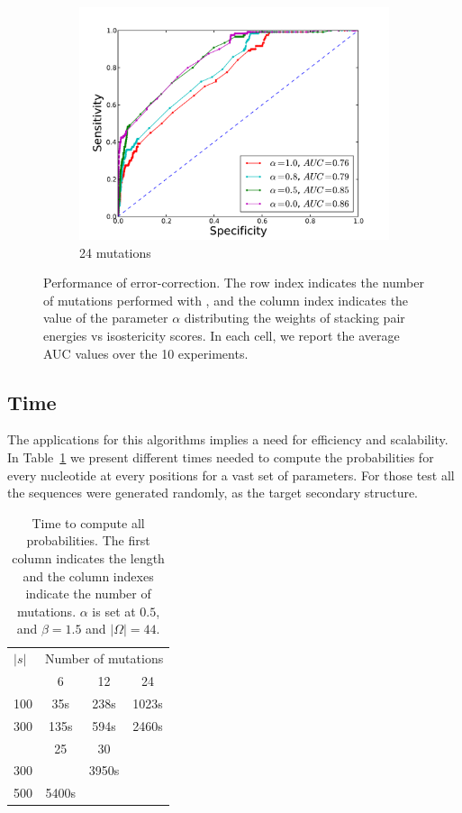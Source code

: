 \begin{figure}
\begin{subfigure}[b]{0.3\textwidth}
\includegraphics[width=1.2\textwidth]{figures/ROC_24.pdf}
\caption{24 mutations}
\label{fig:ROC24mut}
\end{subfigure}
\caption{Performance of error-correction. The row index indicates the number of mutations performed with \RNApyro, and the column index indicates
the value of the parameter $\alpha$ distributing the weights of stacking pair energies vs isostericity scores. In each cell, we report the average AUC
values over the 10 experiments.}
\label{fig:ROCall}
\end{figure}




\subsection{Time}
The applications for this algorithms implies a need for efficiency
and scalability. In Table~\ref{tab:time} we
present different times needed to compute the probabilities for
 every nucleotide at every positions for a vast set of parameters. For those test
 all the sequences were generated randomly, as the target secondary structure.

\begin{table}
\begin{center}
\begin{tabular}{lccc}
$|s|$&\multicolumn{3}{c}{Number of mutations}\\\cline{2-4}
		 			  & 6   &  12  & 24\\\cline{2-4}
100  				& 35s  & 238s & 1023s\\
300  			& 135s & 594s &2460s\\\cline{2-4}
		 						& 25   & 30   &			\\\cline{2-4}
300       &      &  3950s&     \\
500         & 5400s&       &      \\
\end{tabular}
\end{center}
\caption{Time to compute all probabilities. The first column indicates the length and  the column indexes indicate the number
 of mutations. $\alpha$ is
set at $0.5$, and $\beta=1.5$ and $|\Omega|=44$.}
\label{tab:time}
\end{table}
